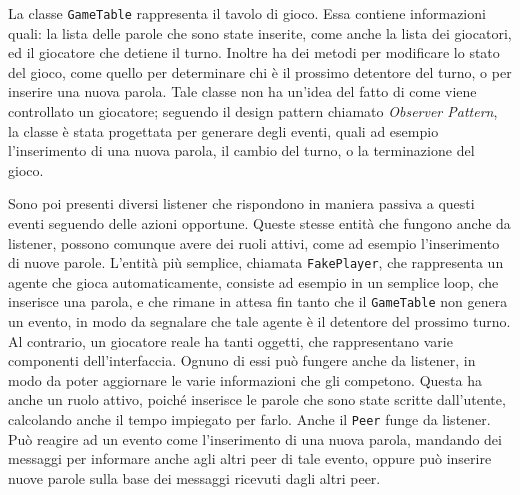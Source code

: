 \documentclass[10.5pt]{article}
\begin{document}
La classe \texttt{GameTable} rappresenta il tavolo di gioco. Essa contiene informazioni quali: la lista delle parole che sono state inserite, come anche la lista dei giocatori, ed il giocatore che detiene il turno. Inoltre ha dei metodi per modificare lo stato del gioco, come quello per determinare chi è il prossimo detentore del turno, o per inserire una nuova parola. Tale classe non ha un'idea del fatto di come viene controllato un giocatore; seguendo il design pattern chiamato \textit{Observer Pattern}, la classe è stata progettata per generare degli eventi, quali ad esempio l'inserimento di una nuova parola, il cambio del turno, o la terminazione del gioco. 

Sono poi presenti diversi listener che rispondono in maniera passiva a questi eventi seguendo delle azioni opportune. Queste stesse entità che fungono anche da listener, possono comunque avere dei ruoli attivi, come ad esempio l'inserimento di nuove parole. L'entità più semplice, chiamata \texttt{FakePlayer}, che rappresenta un agente che gioca automaticamente, consiste ad esempio in un semplice loop, che inserisce una parola, e che rimane in attesa fin tanto che il \texttt{GameTable} non genera un evento, in modo da segnalare che tale agente è il detentore del prossimo turno. Al contrario, un giocatore reale ha tanti oggetti, che rappresentano varie componenti dell'interfaccia. Ognuno di essi può fungere anche da listener, in modo da poter aggiornare le varie informazioni che gli competono. Questa ha anche un ruolo attivo, poiché inserisce le parole che sono state scritte dall'utente, calcolando anche il tempo impiegato per farlo. Anche il \texttt{Peer} funge da listener. Può reagire ad un evento come l'inserimento di una nuova parola, mandando dei messaggi per informare anche agli altri peer di tale evento, oppure può inserire nuove parole sulla base dei messaggi ricevuti dagli altri peer.
\end{document}
